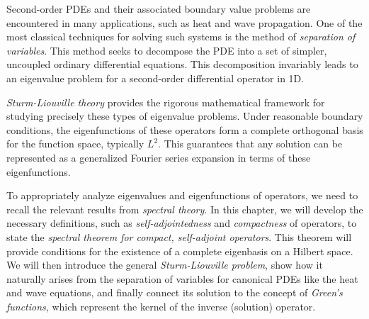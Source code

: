 Second-order PDEs and their associated boundary value problems are encountered in many applications, such as heat and wave propagation. One of the most classical techniques for solving such systems is the method of \emph{separation of variables}. This method seeks to decompose the PDE into a set of simpler, uncoupled ordinary differential equations. This decomposition invariably leads to an eigenvalue problem for a second-order differential operator in 1D.

\emph{Sturm-Liouville theory} provides the rigorous mathematical framework for studying precisely these types of eigenvalue problems. Under reasonable boundary conditions, the eigenfunctions of these operators form a complete orthogonal basis for the function space, typically $L^2$. This guarantees that any solution can be represented as a generalized Fourier series expansion in terms of these eigenfunctions.

To appropriately analyze eigenvalues and eigenfunctions of operators, we need to recall the relevant results from \emph{spectral theory}. In this chapter, we will develop the necessary definitions, such as \emph{self-adjointedness} and \emph{compactness} of operators, to state the \emph{spectral theorem for compact, self-adjoint operators}. This theorem will provide conditions for the existence of a complete eigenbasis on a Hilbert space. We will then introduce the general \emph{Sturm-Liouville problem}, show how it naturally arises from the separation of variables for canonical PDEs like the heat and wave equations, and finally connect its solution to the concept of \emph{Green's functions}, which represent the kernel of the inverse (solution) operator.

